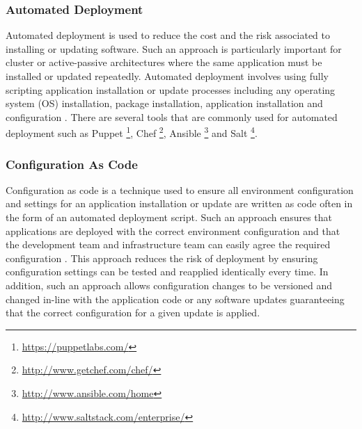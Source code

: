 \documentclass[a4paper,11pt,twoside]{article}
\begin{document}
\subsubsection{Automated Deployment}
Automated deployment is used to reduce the cost and the risk associated to installing or updating software. Such an approach is particularly important for cluster or active-passive architectures where the same application must be installed or updated repeatedly. Automated deployment involves using fully scripting application installation or update processes including any operating system (OS) installation, package installation, application installation and configuration \cite{Automated}. There are several tools that are commonly used for automated deployment such as Puppet \footnote{\url{https://puppetlabs.com/}}, Chef \footnote{\url{http://www.getchef.com/chef/}}, Ansible \footnote{\url{http://www.ansible.com/home}} and Salt \footnote{\url{http://www.saltstack.com/enterprise/}}.

\subsubsection{Configuration As Code}
Configuration as code is a technique used to ensure all environment configuration and settings for an application installation or update are written as code often in the form of an automated deployment script. Such an approach ensures that applications are deployed with the correct environment configuration and that the development team and infrastructure team can easily agree the required configuration \cite{Continuous Delivery}. This approach reduces the risk of deployment by ensuring configuration settings can be tested and reapplied identically every time. In addition, such an approach allows configuration changes to be versioned and changed in-line with the application code or any software updates guaranteeing that the correct configuration for a given update is applied.
\end{document}
